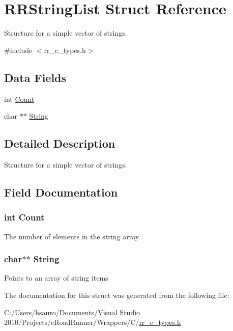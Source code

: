 \hypertarget{struct_r_r_string_list}{
\section{\-R\-R\-String\-List \-Struct \-Reference}
\label{struct_r_r_string_list}
}


\-Structure for a simple vector of strings.  




{\ttfamily \#include $<$rr\-\_\-c\-\_\-types.\-h$>$}

\subsection*{\-Data \-Fields}
\begin{DoxyCompactItemize}
\item 
int \hyperlink{struct_r_r_string_list_aad462966ed963f892117056de1eba502}{\-Count}
\item 
char $\ast$$\ast$ \hyperlink{struct_r_r_string_list_acdbc34377baf3e52d9044aada0f2f511}{\-String}
\end{DoxyCompactItemize}


\subsection{\-Detailed \-Description}
\-Structure for a simple vector of strings. 

\subsection{\-Field \-Documentation}
\hypertarget{struct_r_r_string_list_aad462966ed963f892117056de1eba502}{
\subsubsection[{\-Count}]{\setlength{\rightskip}{0pt plus 5cm}int {\bf \-Count}}}
\label{struct_r_r_string_list_aad462966ed963f892117056de1eba502}
\-The number of elements in the string array \hypertarget{struct_r_r_string_list_acdbc34377baf3e52d9044aada0f2f511}{
\subsubsection[{\-String}]{\setlength{\rightskip}{0pt plus 5cm}char$\ast$$\ast$ {\bf \-String}}}
\label{struct_r_r_string_list_acdbc34377baf3e52d9044aada0f2f511}
\-Points to an array of string items 

\-The documentation for this struct was generated from the following file\-:\begin{DoxyCompactItemize}
\item 
\-C\-:/\-Users/hsauro/\-Documents/\-Visual Studio 2010/\-Projects/c\-Road\-Runner/\-Wrappers/\-C/\hyperlink{rr__c__types_8h}{rr\-\_\-c\-\_\-types.\-h}\end{DoxyCompactItemize}
